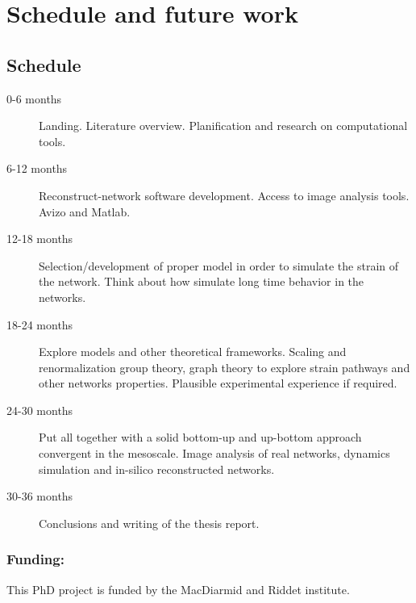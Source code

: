 
\chapter{Schedule and future work} %

\label{Chapter-future} %



\section{Schedule}

\begin{description}
  \item[0-6 months] Landing. Literature overview. Planification and research on
  computational tools.
  \item[6-12 months] Reconstruct-network software development.
   Access to image analysis tools. Avizo and Matlab.
  \item[12-18 months] Selection/development of proper model in order to simulate
  the strain of the network. Think about how simulate long time behavior in the
  networks.
  \item[18-24 months] Explore models and other theoretical frameworks.
  Scaling and renormalization group theory, graph theory to explore strain
  pathways and other networks properties. Plausible experimental experience if
  required.
  \item[24-30 months] Put all together with a solid bottom-up and up-bottom
   approach convergent in the mesoscale. Image analysis of real networks,
   dynamics simulation and in-silico reconstructed networks.
   \item[30-36 months] Conclusions and writing of the
   thesis report.
\end{description}

\subsection{Funding:}
This PhD project is funded by the MacDiarmid and Riddet
institute. 

